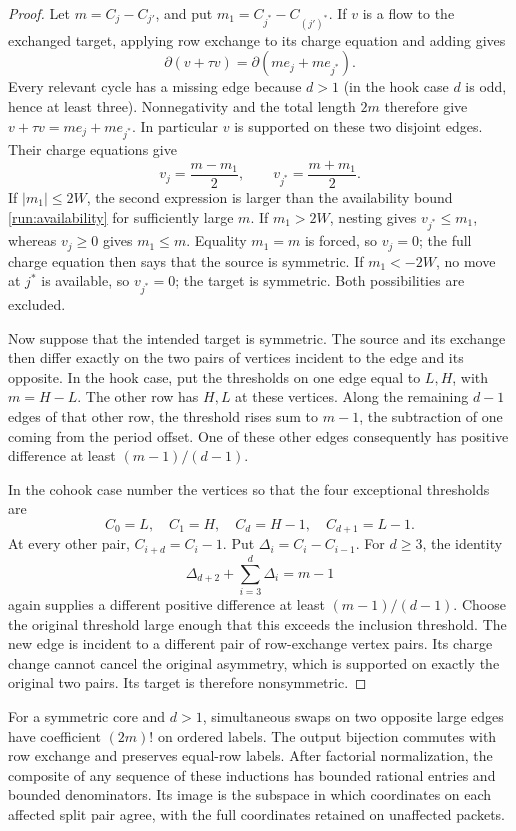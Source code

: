 \begin{proof}
Let \(m=C_j-C_{j'}\), and put
\(m_1=C_{j^*}-C_{(j')^*}\).
If \(v\) is a flow to the exchanged target, applying row
exchange to its charge equation and adding gives
\[
 \partial(v+\tau v)=\partial(me_j+me_{j^*}).
 \]
Every relevant cycle has a missing edge because \(d>1\)
(in the hook case \(d\) is odd, hence at least three).
Nonnegativity and the total length \(2m\) therefore give
\(v+\tau v=me_j+me_{j^*}\).
In particular \(v\) is supported on these two disjoint edges.
Their charge equations give
\begin{equation}\label{run:exchanged-flow}
 v_j=\frac{m-m_1}{2},\qquad
 v_{j^*}=\frac{m+m_1}{2}.
\end{equation}
If \(|m_1|\leq2W\), the second expression is larger than the
availability bound \eqref{run:availability} for sufficiently
large \(m\).  If \(m_1>2W\), nesting gives
\(v_{j^*}\leq m_1\), whereas \(v_j\geq0\) gives \(m_1\leq m\).
Equality \(m_1=m\) is forced, so \(v_j=0\); the full charge
equation then says that the source is symmetric.  If
\(m_1<-2W\), no move at \(j^*\) is available, so
\(v_{j^*}=0\); the target is symmetric.  Both possibilities
are excluded.

Now suppose that the intended target is symmetric.  The source
and its exchange then differ exactly on the two pairs of
vertices incident to the edge and its opposite.  In the hook
case, put the thresholds on one edge equal to \(L,H\), with
\(m=H-L\).  The other row has \(H,L\) at these vertices.
Along the remaining \(d-1\) edges of that other row, the
threshold rises sum to \(m-1\), the subtraction of one coming
from the period offset.  One of these other edges consequently
has positive difference at least \((m-1)/(d-1)\).

In the cohook case number the vertices so that the four
exceptional thresholds are
\[
 C_0=L,\quad C_1=H,\quad C_d=H-1,\quad C_{d+1}=L-1.
 \]
At every other pair, \(C_{i+d}=C_i-1\).
Put \(\Delta_i=C_i-C_{i-1}\).
For \(d\geq3\), the identity
\[
 \Delta_{d+2}+\sum_{i=3}^{d}\Delta_i=m-1
 \]
again supplies a different positive difference at least
\((m-1)/(d-1)\).
Choose the original threshold large enough that this exceeds
the inclusion threshold.  The new edge is incident to a
different pair of row-exchange vertex pairs.  Its charge
change cannot cancel the original asymmetry, which is supported
on exactly the original two pairs.  Its target is therefore
nonsymmetric.
\end{proof}

\begin{lemma}\label{run:symmetric}
For a symmetric core and \(d>1\), simultaneous swaps on two
opposite large edges have coefficient \((2m)!\) on ordered
labels.  The output bijection commutes with row exchange and
preserves equal-row labels.
After factorial normalization, the composite of any sequence
of these inductions has bounded rational entries and bounded
denominators.  Its image is the subspace in which coordinates
on each affected split pair agree, with the full coordinates
retained on unaffected packets.
\end{lemma}


